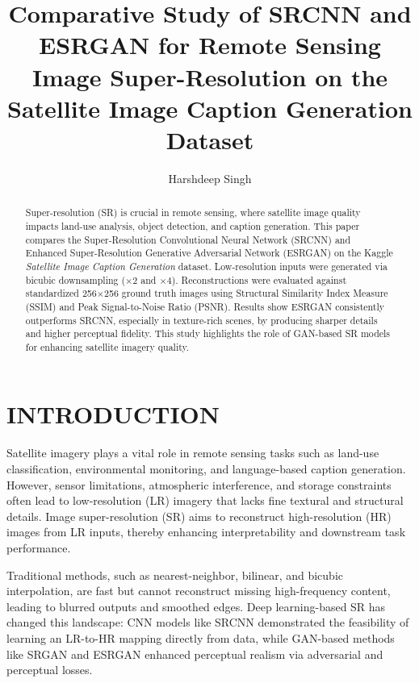 \documentclass[]{spie}
\title{Comparative Study of SRCNN and ESRGAN for Remote Sensing Image Super-Resolution on the Satellite Image Caption Generation Dataset}
\author[a]{Harshdeep Singh}
\affil[a]{Sri Guru Granth Sahib World University, Fatehgarh Sahib, India}
\begin{document}
\maketitle

\begin{abstract}
Super-resolution (SR) is crucial in remote sensing, where satellite image quality impacts land-use analysis, object detection, and caption generation. This paper compares the Super-Resolution Convolutional Neural Network (SRCNN) and Enhanced Super-Resolution Generative Adversarial Network (ESRGAN) on the Kaggle \textit{Satellite Image Caption Generation} dataset. Low-resolution inputs were generated via bicubic downsampling ($\times2$ and $\times4$). Reconstructions were evaluated against standardized 256$\times$256 ground truth images using Structural Similarity Index Measure (SSIM) and Peak Signal-to-Noise Ratio (PSNR). Results show ESRGAN consistently outperforms SRCNN, especially in texture-rich scenes, by producing sharper details and higher perceptual fidelity. This study highlights the role of GAN-based SR models for enhancing satellite imagery quality.
\end{abstract}


\section{INTRODUCTION}
Satellite imagery plays a vital role in remote sensing tasks such as land-use classification, environmental monitoring, and language-based caption generation. However, sensor limitations, atmospheric interference, and storage constraints often lead to low-resolution (LR) imagery that lacks fine textural and structural details. Image super-resolution (SR) aims to reconstruct high-resolution (HR) images from LR inputs, thereby enhancing interpretability and downstream task performance.

Traditional methods, such as nearest-neighbor, bilinear, and bicubic interpolation, are fast but cannot reconstruct missing high-frequency content, leading to blurred outputs and smoothed edges. Deep learning-based SR has changed this landscape: CNN models like SRCNN \cite{dong2014learning} demonstrated the feasibility of learning an LR-to-HR mapping directly from data, while GAN-based methods like SRGAN \cite{ledig2017srgan} and ESRGAN \cite{wang2018esrgan} enhanced perceptual realism via adversarial and perceptual losses.
\end{document}
